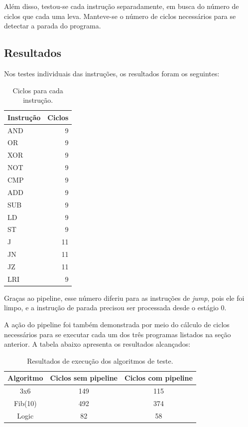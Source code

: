 \documentclass[a4paper]{article}
\begin{document}
Além disso, testou-se cada instrução separadamente, em busca do número de ciclos que cada uma leva.
Manteve-se o número de ciclos necessários para se detectar a parada do programa. 
\subsection{Resultados}

Nos testes individuais das instruções, os resultados foram os seguintes:

\begin{table}[H]
\centering
\begin{tabular}{l | r}
Instrução & Ciclos\\
	\hline
    AND & 9\\ 
    OR  & 9\\
    XOR & 9\\
    NOT & 9\\
    CMP & 9\\
    ADD & 9\\
    SUB & 9\\
    LD  & 9\\
    ST  & 9\\
    J   & 11\\
    JN  & 11\\
    JZ  & 11\\
    LRI & 9\\
\end{tabular}
\label{tab:insttest}
\caption{Ciclos para cada instrução.}
\end{table}

Graças ao pipeline, esse número diferiu para as instruções de \emph{jump}, 
pois ele foi limpo, e a instrução de parada precisou ser processada desde o estágio
0.

A ação do pipeline foi também demonstrada por meio do cálculo de ciclos necessários para se executar
cada um dos três programas listados na seção anterior. 
A tabela abaixo apresenta os resultados alcançados:

\begin{table}[H]
	\centering
	\begin{tabular}{c | c | c}

	Algoritmo	& Ciclos sem pipeline	& Ciclos com pipeline\\
	\hline
	3x6		& 149			& 115		     \\
	Fib(10)		& 492			& 374		     \\
	Logic	        & 82			& 58		     \\
	\hline
	\end{tabular}
	\caption{Resultados de execução dos algoritmos de teste.}
	\label{tab:resultados}
\end{table}
\end{document}
